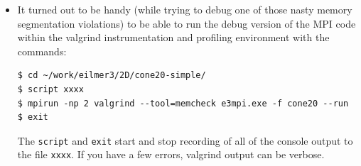 \begin{itemize}
\item It turned out to be handy 
  (while trying to debug one of those nasty memory segmentation violations) 
  to be able to run the debug version of the MPI code within the valgrind 
  instrumentation and profiling environment with the commands:
\begin{verbatim}
$ cd ~/work/eilmer3/2D/cone20-simple/
$ script xxxx
$ mpirun -np 2 valgrind --tool=memcheck e3mpi.exe -f cone20 --run
$ exit
\end{verbatim}
  The \texttt{script} and \texttt{exit} start and stop recording of all of the console output
  to the file \texttt{xxxx}.
  If you have a few errors, valgrind output can be verbose.

\end{itemize}
